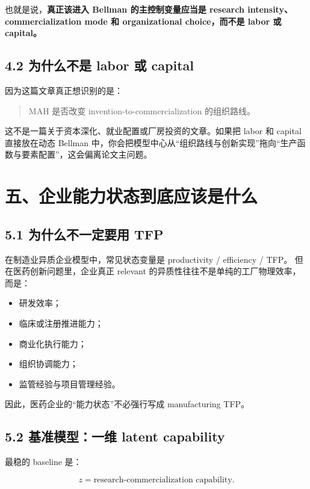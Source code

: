 \documentclass[12pt]{ctexart}
\begin{document}
也就是说，\textbf{真正该进入 Bellman 的主控制变量应当是 research intensity、commercialization mode 和 organizational choice，而不是 labor 或 capital。}

\subsection{4.2 为什么不是 labor 或 capital}

因为这篇文章真正想识别的是：

\begin{quote}
MAH 是否改变 invention-to-commercialization 的组织路线。
\end{quote}

这不是一篇关于资本深化、就业配置或厂房投资的文章。如果把 labor 和 capital 直接放在动态 Bellman 中，你会把模型中心从“组织路线与创新实现”拖向“生产函数与要素配置”，这会偏离论文主问题。

\section{五、企业能力状态到底应该是什么}

\subsection{5.1 为什么不一定要用 TFP}

在制造业异质企业模型中，常见状态变量是 productivity / efficiency / TFP。
但在医药创新问题里，企业真正 relevant 的异质性往往不是单纯的工厂物理效率，而是：

\begin{itemize}[leftmargin=2em]
    \item 研发效率；
    \item 临床或注册推进能力；
    \item 商业化执行能力；
    \item 组织协调能力；
    \item 监管经验与项目管理经验。
\end{itemize}

因此，医药企业的“能力状态”不必强行写成 manufacturing TFP。

\subsection{5.2 基准模型：一维 latent capability}

最稳的 baseline 是：

\[
z=\text{research-commercialization capability}.
\]
\end{document}

